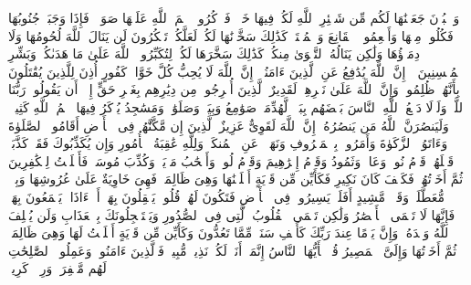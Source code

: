 \stopbuffer%
\startbuffer[\q:22:36]
وَٱلۡبُدۡنَ جَعَلۡنَٰهَا لَكُم مِّن شَعَٰۤئِرِ ٱللَّهِ لَكُمۡ فِیهَا خَیۡرࣱۖ فَٱذۡكُرُوا۟ ٱسۡمَ ٱللَّهِ عَلَیۡهَا صَوَاۤفَّۖ فَإِذَا وَجَبَتۡ جُنُوبُهَا فَكُلُوا۟ مِنۡهَا وَأَطۡعِمُوا۟ ٱلۡقَانِعَ وَٱلۡمُعۡتَرَّۚ كَذَٰلِكَ سَخَّرۡنَٰهَا لَكُمۡ لَعَلَّكُمۡ تَشۡكُرُونَ%
\stopbuffer%
\startbuffer[\q:22:37]
لَن یَنَالَ ٱللَّهَ لُحُومُهَا وَلَا دِمَاۤؤُهَا وَلَٰكِن یَنَالُهُ ٱلتَّقۡوَىٰ مِنكُمۡۚ كَذَٰلِكَ سَخَّرَهَا لَكُمۡ لِتُكَبِّرُوا۟ ٱللَّهَ عَلَىٰ مَا هَدَىٰكُمۡۗ وَبَشِّرِ ٱلۡمُحۡسِنِینَ%
\stopbuffer%
\startbuffer[\q:22:38]
۞ إِنَّ ٱللَّهَ یُدَٰفِعُ عَنِ ٱلَّذِینَ ءَامَنُوۤا۟ۗ إِنَّ ٱللَّهَ لَا یُحِبُّ كُلَّ خَوَّانࣲ كَفُورٍ%
\stopbuffer%
\startbuffer[\q:22:39]
أُذِنَ لِلَّذِینَ یُقَٰتَلُونَ بِأَنَّهُمۡ ظُلِمُوا۟ۚ وَإِنَّ ٱللَّهَ عَلَىٰ نَصۡرِهِمۡ لَقَدِیرٌ%
\stopbuffer%
\startbuffer[\q:22:40]
ٱلَّذِینَ أُخۡرِجُوا۟ مِن دِیَٰرِهِم بِغَیۡرِ حَقٍّ إِلَّاۤ أَن یَقُولُوا۟ رَبُّنَا ٱللَّهُۗ وَلَوۡلَا دَفۡعُ ٱللَّهِ ٱلنَّاسَ بَعۡضَهُم بِبَعۡضࣲ لَّهُدِّمَتۡ صَوَٰمِعُ وَبِیَعࣱ وَصَلَوَٰتࣱ وَمَسَٰجِدُ یُذۡكَرُ فِیهَا ٱسۡمُ ٱللَّهِ كَثِیرࣰاۗ وَلَیَنصُرَنَّ ٱللَّهُ مَن یَنصُرُهُۥۤۚ إِنَّ ٱللَّهَ لَقَوِیٌّ عَزِیزٌ%
\stopbuffer%
\startbuffer[\q:22:41]
ٱلَّذِینَ إِن مَّكَّنَّٰهُمۡ فِی ٱلۡأَرۡضِ أَقَامُوا۟ ٱلصَّلَوٰةَ وَءَاتَوُا۟ ٱلزَّكَوٰةَ وَأَمَرُوا۟ بِٱلۡمَعۡرُوفِ وَنَهَوۡا۟ عَنِ ٱلۡمُنكَرِۗ وَلِلَّهِ عَٰقِبَةُ ٱلۡأُمُورِ%
\stopbuffer%
\startbuffer[\q:22:42]
وَإِن یُكَذِّبُوكَ فَقَدۡ كَذَّبَتۡ قَبۡلَهُمۡ قَوۡمُ نُوحࣲ وَعَادࣱ وَثَمُودُ%
\stopbuffer%
\startbuffer[\q:22:43]
وَقَوۡمُ إِبۡرَٰهِیمَ وَقَوۡمُ لُوطࣲ%
\stopbuffer%
\startbuffer[\q:22:44]
وَأَصۡحَٰبُ مَدۡیَنَۖ وَكُذِّبَ مُوسَىٰۖ فَأَمۡلَیۡتُ لِلۡكَٰفِرِینَ ثُمَّ أَخَذۡتُهُمۡۖ فَكَیۡفَ كَانَ نَكِیرِ%
\stopbuffer%
\startbuffer[\q:22:45]
فَكَأَیِّن مِّن قَرۡیَةٍ أَهۡلَكۡنَٰهَا وَهِیَ ظَالِمَةࣱ فَهِیَ خَاوِیَةٌ عَلَىٰ عُرُوشِهَا وَبِئۡرࣲ مُّعَطَّلَةࣲ وَقَصۡرࣲ مَّشِیدٍ%
\stopbuffer%
\startbuffer[\q:22:46]
أَفَلَمۡ یَسِیرُوا۟ فِی ٱلۡأَرۡضِ فَتَكُونَ لَهُمۡ قُلُوبࣱ یَعۡقِلُونَ بِهَاۤ أَوۡ ءَاذَانࣱ یَسۡمَعُونَ بِهَاۖ فَإِنَّهَا لَا تَعۡمَى ٱلۡأَبۡصَٰرُ وَلَٰكِن تَعۡمَى ٱلۡقُلُوبُ ٱلَّتِی فِی ٱلصُّدُورِ%
\stopbuffer%
\startbuffer[\q:22:47]
وَیَسۡتَعۡجِلُونَكَ بِٱلۡعَذَابِ وَلَن یُخۡلِفَ ٱللَّهُ وَعۡدَهُۥۚ وَإِنَّ یَوۡمًا عِندَ رَبِّكَ كَأَلۡفِ سَنَةࣲ مِّمَّا تَعُدُّونَ%
\stopbuffer%
\startbuffer[\q:22:48]
وَكَأَیِّن مِّن قَرۡیَةٍ أَمۡلَیۡتُ لَهَا وَهِیَ ظَالِمَةࣱ ثُمَّ أَخَذۡتُهَا وَإِلَیَّ ٱلۡمَصِیرُ%
\stopbuffer%
\startbuffer[\q:22:49]
قُلۡ یَٰۤأَیُّهَا ٱلنَّاسُ إِنَّمَاۤ أَنَا۠ لَكُمۡ نَذِیرࣱ مُّبِینࣱ%
\stopbuffer%
\startbuffer[\q:22:50]
فَٱلَّذِینَ ءَامَنُوا۟ وَعَمِلُوا۟ ٱلصَّٰلِحَٰتِ لَهُم مَّغۡفِرَةࣱ وَرِزۡقࣱ كَرِیمࣱ%
